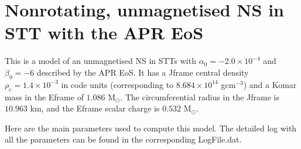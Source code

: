 \documentclass[letterpaper,10pt,english]{sphinxmanual}
\begin{document}
\section{Non\sphinxhyphen{}rotating, unmagnetised NS in STT with the APR EoS}
\label{\detokenize{examples_stt:non-rotating-unmagnetised-ns-in-stt-with-the-apr-eos}}
\sphinxAtStartPar
This is a model of an unmagnetised NS in STTs with \(\alpha _0 = -2.0\times 10^{-4}\) and \(\beta _0 = -6\) described by the APR EoS. It has a J\sphinxhyphen{}frame central density \(\rho _\mathrm{c}=1.4\times 10^{-3}\) in code units (corresponding to \(8.684\times 10^{14}\) gcm\(^{-3}\)) and a Komar mass in the E\sphinxhyphen{}frame of \(1.086\) M\( _\odot\). The circumferential radius in the J\sphinxhyphen{}frame is \(10.963\) km, and the E\sphinxhyphen{}frame scalar charge is \(0.532\) M\( _\odot\).

\sphinxAtStartPar
Here are the main parameters used to compute this model. The detailed log with all the parameters can be found in the corresponding LogFile.dat.

\begin{sphinxVerbatim}[commandchars=\\\{\}]
                    
                 
              
              
\end{sphinxVerbatim}
\end{document}
